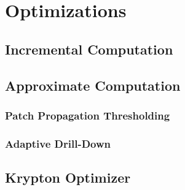 \section{Optimizations}

\subsection{Incremental Computation}\label{sec:inc_computation}

\subsection{Approximate Computation}

\subsubsection{Patch Propagation Thresholding}

\subsubsection{Adaptive Drill-Down}

\subsection{Krypton Optimizer}